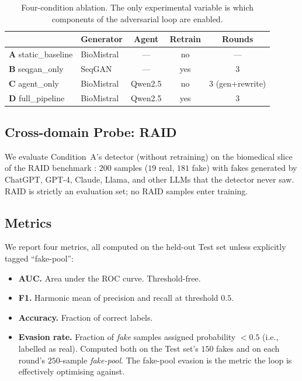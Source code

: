 \documentclass[conference]{IEEEtran}
\begin{document}
\begin{table}[t]
\caption{Four-condition ablation. The only experimental variable is which
components of the adversarial loop are enabled.}
\label{tab:conditions}
\centering
\renewcommand{\arraystretch}{1.15}
\begin{tabular}{@{}llccc@{}}
\toprule
& \textbf{Generator} & \textbf{Agent} & \textbf{Retrain} & \textbf{Rounds} \\
\midrule
\textbf{A} static\_baseline & BioMistral & --- & no  & --- \\
\textbf{B} seqgan\_only     & SeqGAN     & --- & yes & 3 \\
\textbf{C} agent\_only      & BioMistral & Qwen2.5 & no  & 3 (gen+rewrite) \\
\textbf{D} full\_pipeline   & BioMistral & Qwen2.5 & yes & 3 \\
\bottomrule
\end{tabular}
\end{table}

\subsection{Cross-domain Probe: RAID}
\label{ssec:raid}
We evaluate Condition~A's detector (without retraining) on the biomedical
slice of the RAID benchmark \cite{dugan2024raid}: \(200\) samples
(\(19\) real, \(181\) fake) with fakes generated by ChatGPT, GPT-4,
Claude, Llama, and other LLMs that the detector never saw. RAID is
strictly an evaluation set; no RAID samples enter training.

\subsection{Metrics}
\label{ssec:metrics}
We report four metrics, all computed on the held-out Test set unless
explicitly tagged ``fake-pool'':

\begin{itemize}[leftmargin=*]
\item \textbf{AUC.} Area under the ROC curve. Threshold-free.
\item \textbf{F1.} Harmonic mean of precision and recall at threshold
  \(0.5\).
\item \textbf{Accuracy.} Fraction of correct labels.
\item \textbf{Evasion rate.} Fraction of \emph{fake} samples assigned
  probability $< 0.5$ (i.e., labelled as real). Computed both on the
  Test set's \(150\) fakes and on each round's \(250\)-sample
  \emph{fake-pool}. The fake-pool evasion is the metric the loop is
  effectively optimising against.
\end{itemize}
\end{document}
